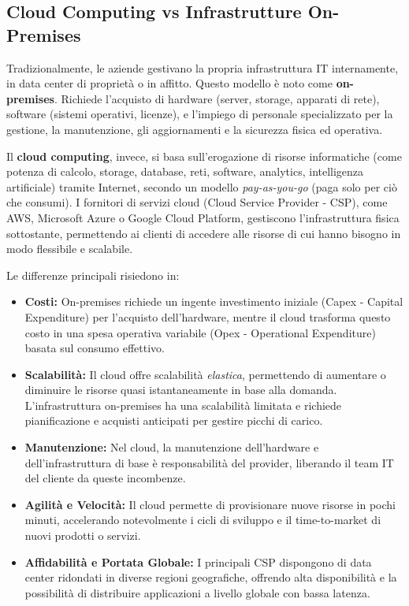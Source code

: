 \subsection{Cloud Computing vs Infrastrutture On-Premises}
\label{sec:cloud-vs-onprem}

Tradizionalmente, le aziende gestivano la propria infrastruttura IT internamente, in data center di proprietà o in affitto. Questo modello è noto come \textbf{on-premises}. Richiede l'acquisto di hardware (server, storage, apparati di rete), software (sistemi operativi, licenze), e l'impiego di personale specializzato per la gestione, la manutenzione, gli aggiornamenti e la sicurezza fisica ed operativa.

Il \textbf{cloud computing}, invece, si basa sull'erogazione di risorse informatiche (come potenza di calcolo, storage, database, reti, software, analytics, intelligenza artificiale) tramite Internet, secondo un modello \textit{pay-as-you-go} (paga solo per ciò che consumi). I fornitori di servizi cloud (Cloud Service Provider - CSP), come AWS, Microsoft Azure o Google Cloud Platform, gestiscono l'infrastruttura fisica sottostante, permettendo ai clienti di accedere alle risorse di cui hanno bisogno in modo flessibile e scalabile.

Le differenze principali risiedono in:
\begin{itemize}
    \item \textbf{Costi:} On-premises richiede un ingente investimento iniziale (Capex - Capital Expenditure) per l'acquisto dell'hardware, mentre il cloud trasforma questo costo in una spesa operativa variabile (Opex - Operational Expenditure) basata sul consumo effettivo.
    \item \textbf{Scalabilità:} Il cloud offre scalabilità \textit{elastica}, permettendo di aumentare o diminuire le risorse quasi istantaneamente in base alla domanda. L'infrastruttura on-premises ha una scalabilità limitata e richiede pianificazione e acquisti anticipati per gestire picchi di carico.
    \item \textbf{Manutenzione:} Nel cloud, la manutenzione dell'hardware e dell'infrastruttura di base è responsabilità del provider, liberando il team IT del cliente da queste incombenze.
    \item \textbf{Agilità e Velocità:} Il cloud permette di provisionare nuove risorse in pochi minuti, accelerando notevolmente i cicli di sviluppo e il time-to-market di nuovi prodotti o servizi.
    \item \textbf{Affidabilità e Portata Globale:} I principali CSP dispongono di data center ridondati in diverse regioni geografiche, offrendo alta disponibilità e la possibilità di distribuire applicazioni a livello globale con bassa latenza.
\end{itemize}

